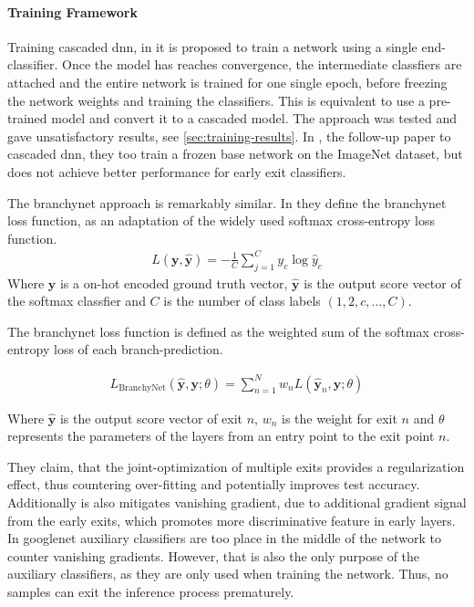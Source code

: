 \paragraph{Training Framework} 
Training cascaded \gls{dnn}, in \cite{leroux_resource-constrained_2015} it is proposed to train a network using a single end-classifier. Once the model has reaches convergence, the intermediate classfiers are attached and the entire network is trained for one single epoch, before freezing the network weights and training the classifiers. This is equivalent to use a pre-trained model and convert it to a cascaded model. The approach was tested and gave unsatisfactory results, see \ref{sec:training-results}. In \cite{leroux_cascading_2017}, the follow-up paper to cascaded \gls{dnn}, they too train a frozen base network on the ImageNet dataset, but does not achieve better performance for early exit classifiers.  

The \gls{branchynet} approach is remarkably similar. In \cite{teerapittayanon_branchynet:_2016} they define the \gls{branchynet} loss function, as an adaptation of the widely used softmax cross-entropy loss function.
\begin{align}
L\left(\mathbf{y},\hat{\mathbf{y}}\right) = - \frac{1}{C} \sum_{j =1}^{C} y_c \log \hat{y}_c
\end{align}
Where $ \bm{y} $ is a on-hot encoded ground truth vector, $ \bm{\hat{y}} $ is the output score vector of the softmax classfier and $ C $ is the number of class labels $ (1, 2, c, \dots, C) $.
	
The \gls{branchynet} loss function is defined as the weighted sum of the softmax cross-entropy loss of each branch-prediction. 

\begin{align}
	L_{\mathrm{BranchyNet}}(\hat{\mathbf{y}},\mathbf{y};\theta) = \sum_{n=1}^{N} w_n L \left(\hat{\mathbf{y}}_{n},\mathbf{y};\theta\right)
\end{align}

Where $ \bm{\hat{y}} $ is the output score vector of exit $ n $, $ w_n $ is the weight for exit $ n $ and $ \theta $ represents the parameters of the layers from an entry point to the exit point $ n $.

They claim, that the joint-optimization of multiple exits provides a regularization effect, thus countering over-fitting and potentially improves test accuracy. Additionally is also mitigates vanishing gradient, due to additional gradient signal from the early exits, which promotes more discriminative feature in early layers. In \gls{googlenet} \cite{szegedy_going_2015} auxiliary classifiers are too place in the middle of the network to counter vanishing gradients. However, that is also the only purpose of the auxiliary classifiers, as they are only used when training the network. Thus, no samples can exit the inference process prematurely. 

